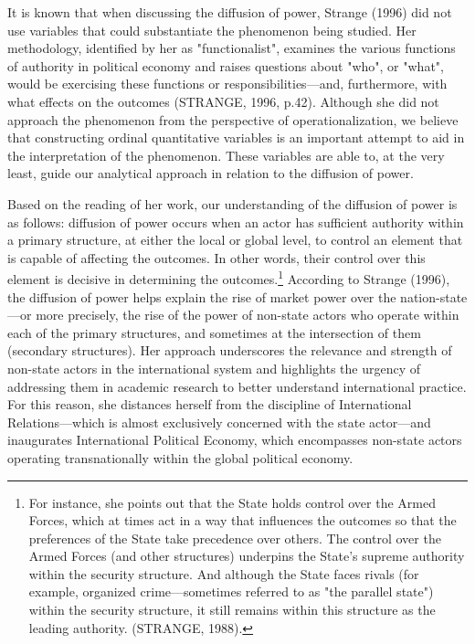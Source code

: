 It is known that when discussing the diffusion of power, Strange (1996) did not use variables that could substantiate the phenomenon being studied. Her methodology, identified by her as "functionalist", examines the various functions of authority in political economy and raises questions about "who", or "what", would be exercising these functions or responsibilities—and, furthermore, with what effects on the outcomes (STRANGE, 1996, p.42). Although she did not approach the phenomenon from the perspective of operationalization, we believe that constructing ordinal quantitative variables is an important attempt to aid in the interpretation of the phenomenon. These variables are able to, at the very least, guide our analytical approach in relation to the diffusion of power.

Based on the reading of her work, our understanding of the diffusion of power is as follows: diffusion of power occurs when an actor has sufficient authority within a primary structure, at either the local or global level, to control an element that is capable of affecting the outcomes. In other words, their control over this element is decisive in determining the outcomes.\footnote{For instance, she points out that the State holds control over the Armed Forces, which at times act in a way that influences the outcomes so that the preferences of the State take precedence over others. The control over the Armed Forces (and other structures) underpins the State's supreme authority within the security structure. And although the State faces rivals (for example, organized crime—sometimes referred to as "the parallel state") within the security structure, it still remains within this structure as the leading authority. (STRANGE, 1988).} According to Strange (1996), the diffusion of power helps explain the rise of market power over the nation-state—or more precisely, the rise of the power of non-state actors who operate within each of the primary structures, and sometimes at the intersection of them (secondary structures). Her approach underscores the relevance and strength of non-state actors in the international system and highlights the urgency of addressing them in academic research to better understand international practice. For this reason, she distances herself from the discipline of International Relations—which is almost exclusively concerned with the state actor—and inaugurates International Political Economy, which encompasses non-state actors operating transnationally within the global political economy.


